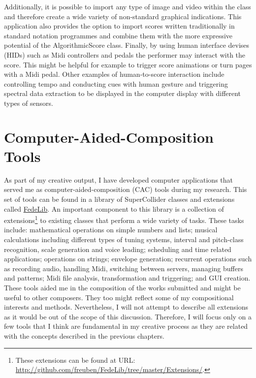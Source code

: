 Additionally, it is possible to import any type of image and video within the class and therefore create a wide variety of non-standard graphical indications. This application also provides the option to import scores written traditionally in standard notation programmes and combine them with the more expressive potential of the AlgorithmicScore class. Finally, by using human interface devises (HIDs) such as Midi controllers and pedals the performer may interact with the score. This might be helpful for example to trigger score animations or turn pages with a Midi pedal. Other examples of human-to-score interaction include controlling tempo and conducting cues with human gesture and triggering spectral data extraction to be displayed in the computer display with different types of sensors. 

\section{Computer-Aided-Composition Tools}

As part of my creative output, I have developed computer applications that served me as computer-aided-composition (CAC) tools during my research. This set of tools can be found in a library of  SuperCollider classes and extensions called \href{http://github.com/freuben/FedeLib}{FedeLib}. An important component to this library is a collection of extensions\footnote{These extensions can be found at URL: \href{http://github.com/freuben/FedeLib/tree/master/Extensions/}{http://github.com/freuben/FedeLib/tree/master/Extensions/}.} to existing classes that perform a wide variety of tasks. These tasks include: mathematical operations on simple numbers and lists; musical calculations including different types of tuning systems, interval and pitch-class recognition, scale generation and voice leading; scheduling and time related applications; operations on strings; envelope generation; recurrent operations such as recording audio, handling Midi, switching between servers, managing buffers and patterns; Midi file analysis, transformation and triggering; and GUI creation. These tools aided me in the composition of the works submitted and might be useful to other composers. They too might reflect some of my compositional interests and methods. Nevertheless, I will not attempt to describe all extensions as it would be out of the scope of this discussion. Therefore, I will focus only on a few tools that I think are fundamental in my creative process as they are related with the concepts described in the previous chapters.

